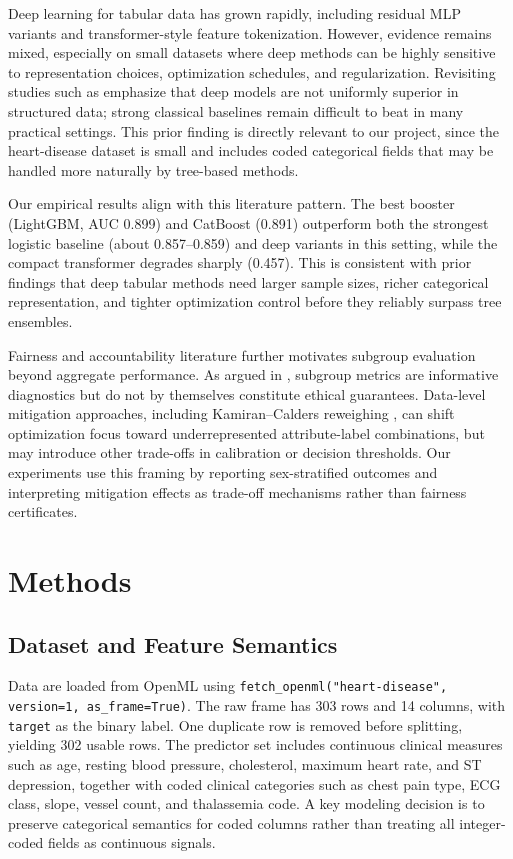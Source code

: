 ﻿\documentclass[11pt]{article}
\begin{document}
Deep learning for tabular data has grown rapidly, including residual MLP variants and transformer-style feature tokenization. However, evidence remains mixed, especially on small datasets where deep methods can be highly sensitive to representation choices, optimization schedules, and regularization. Revisiting studies such as \cite{gorishniy2021revisiting} emphasize that deep models are not uniformly superior in structured data; strong classical baselines remain difficult to beat in many practical settings. This prior finding is directly relevant to our project, since the heart-disease dataset is small and includes coded categorical fields that may be handled more naturally by tree-based methods.

Our empirical results align with this literature pattern. The best booster (LightGBM, AUC 0.899) and CatBoost (0.891) outperform both the strongest logistic baseline (about 0.857--0.859) and deep variants in this setting, while the compact transformer degrades sharply (0.457). This is consistent with prior findings that deep tabular methods need larger sample sizes, richer categorical representation, and tighter optimization control before they reliably surpass tree ensembles.

Fairness and accountability literature further motivates subgroup evaluation beyond aggregate performance. As argued in \cite{barocas2023fairness}, subgroup metrics are informative diagnostics but do not by themselves constitute ethical guarantees. Data-level mitigation approaches, including Kamiran--Calders reweighing \cite{kamiran2012data}, can shift optimization focus toward underrepresented attribute-label combinations, but may introduce other trade-offs in calibration or decision thresholds. Our experiments use this framing by reporting sex-stratified outcomes and interpreting mitigation effects as trade-off mechanisms rather than fairness certificates.

\section{Methods}
\subsection{Dataset and Feature Semantics}
Data are loaded from OpenML using \texttt{fetch\_openml("heart-disease", version=1, as\_frame=True)}. The raw frame has 303 rows and 14 columns, with \texttt{target} as the binary label. One duplicate row is removed before splitting, yielding 302 usable rows. The predictor set includes continuous clinical measures such as age, resting blood pressure, cholesterol, maximum heart rate, and ST depression, together with coded clinical categories such as chest pain type, ECG class, slope, vessel count, and thalassemia code. A key modeling decision is to preserve categorical semantics for coded columns rather than treating all integer-coded fields as continuous signals.
\end{document}
